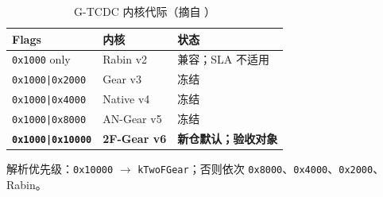 \begin{table}[htbp]
\centering
\caption{G-TCDC 内核代际（摘自 ）}
\label{tab:kernel-matrix}
\small
\begin{tabular}{@{}lll@{}}
\toprule
\textbf{Flags} & \textbf{内核} & \textbf{状态} \\
\midrule
\texttt{0x1000} only & Rabin v2 & 兼容；SLA 不适用 \\
\texttt{0x1000|0x2000} & Gear v3 & 冻结 \\
\texttt{0x1000|0x4000} & Native v4 & 冻结 \\
\texttt{0x1000|0x8000} & AN-Gear v5 & 冻结 \\
\textbf{\texttt{0x1000|0x10000}} & \textbf{2F-Gear v6} & \textbf{新仓默认；验收对象} \\
\bottomrule
\end{tabular}
\end{table}

解析优先级：\texttt{0x10000} $\rightarrow$ \texttt{kTwoFGear}；否则依次 \texttt{0x8000}、\texttt{0x4000}、\texttt{0x2000}、Rabin。
